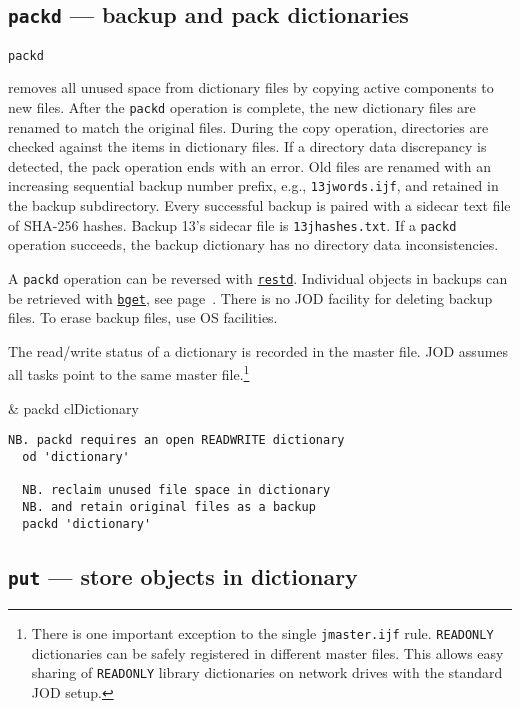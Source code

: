 \subsection{\texttt{packd} --- backup and pack dictionaries}\label{ss:packd}

\hypertarget{il:packd}{\texttt{packd}} removes all unused space 
from dictionary files by copying active components to new files.
 After the \texttt{packd} operation is complete, the new dictionary files 
 are renamed to match the original files. During the copy operation, directories 
 are checked against the items in dictionary files. If 
 a directory data discrepancy is detected,
 the pack operation ends with an error. Old files are renamed 
 with an increasing sequential backup number prefix, e.g., \verb|13jwords.ijf|, and 
 retained in the backup subdirectory. Every successful backup is paired
with a sidecar text file of SHA-256 hashes. Backup 13's sidecar file is \verb|13jhashes.txt|. If a \texttt{packd} operation succeeds, 
 the backup dictionary has no directory data inconsistencies. 

A \texttt{packd} operation can be reversed with \hyperlink{il:restd}{\texttt{restd}}.
Individual objects in backups can be retrieved with \hyperlink{il:bget}{\texttt{bget}}, see page~\pageref{ss:bget}.
There is no JOD facility for deleting backup files. To erase backup files, use OS facilities. 

The read/write status of a dictionary is recorded in 
the master file. JOD assumes all tasks point to the same master file.\footnote{There is one
important exception to the single \texttt{jmaster.ijf} rule. \texttt{READONLY}
dictionaries can be safely registered in different master files. This allows 
easy sharing of \texttt{READONLY} library dictionaries on network drives with
the standard JOD setup.
} 

\begin{wordhead}
\monad & packd clDictionary \\
\end{wordhead}
\begin{lstlisting}[frame=single,framerule=0pt] 
  NB. packd requires an open READWRITE dictionary
  od 'dictionary'   
   
  NB. reclaim unused file space in dictionary
  NB. and retain original files as a backup 
  packd 'dictionary' 
\end{lstlisting}                  


\subsection{\texttt{put} --- store objects in dictionary}\label{ss:put}

